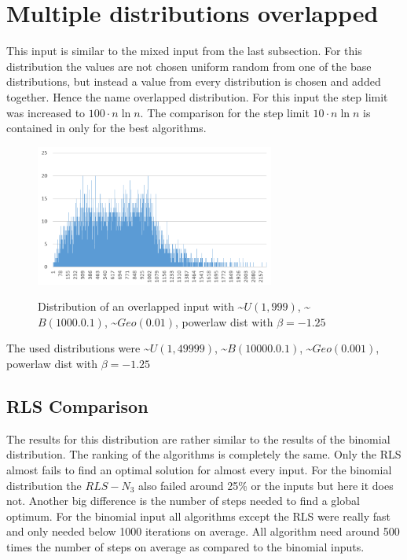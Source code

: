 \section{Multiple distributions overlapped}
This input is similar to the mixed input from the last subsection.
For this distribution the values are not chosen uniform random from one of the base distributions, but instead a value from every distribution is chosen and added together.
Hence the name overlapped distribution.
For this input the step limit was increased to $100\cdot n \ln n$.
The comparison for the step limit $10\cdot n \ln n$ is contained in only for the best algorithms.

\begin{figure}[h]
      \caption{Distribution of an overlapped input with \textasciitilde$U(1,999)$, \textasciitilde$B(1000.0.1)$, \textasciitilde$Geo(0.01)$, powerlaw dist with $\beta=-1.25$}
      \centering
      \includegraphics[width=0.7\textwidth]{figures/images/numberGenerator/overlapped.png}\label{fig:overlappedDistExample}
\end{figure}

The used distributions were \textasciitilde$U(1,49999)$, \textasciitilde$B(10000.0.1)$, \textasciitilde$Geo(0.001)$, powerlaw dist with $\beta=-1.25$
\subsection{RLS Comparison}




The results for this distribution are rather similar to the results of the binomial distribution.
The ranking of the algorithms is completely the same.
Only the RLS almost fails to find an optimal solution for almost every input.
For the binomial distribution the $RLS-N_3$ also failed around 25\% or the inputs but here it does not.
Another big difference is the number of steps needed to find a global optimum.
For the binomial input all algorithms except the RLS were really fast and only needed below 1000 iterations on average.
All algorithm need around 500 times the number of steps on average as compared to the binomial inputs.
